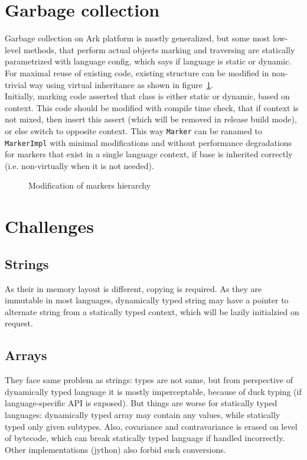 \documentclass[times, %
               specification,annotation, %
               titlepage-extra-ru,specification-extra-ru,annotation-extra-ru, %
               languages={russian,english} %
              ]{itmo-student-thesis}
\begin{document}
\section{Garbage collection}
Garbage collection on Ark platform is mostly generalized, but some most low-level methods, that perform actual objects marking and traversing are statically parametrized with language config, which says if language is static or dynamic. For maximal reuse of existing code, existing structure can be modified in non-trivial way using virtual inheritance as shown in figure~\ref{fig:gc-markers}.\\
Initially, marking code asserted that class is either static or dynamic, based on context. This code should be modified with compile time check, that if context is not mixed, then insert this assert (which will be removed in release build mode), or else switch to opposite context. This way \texttt{Marker} can be ranamed to \texttt{MarkerImpl} with minimal modifications and without performance degradations for markers that exist in a single language context, if base is inherited correctly (i.e. non-virtually when it is not needed).\\
\begin{figure}[H]
\caption{Modification of markers hierarchy}\label{fig:gc-markers}
\centering
\end{figure}

\section{Challenges}
\subsection{Strings}
As their in memory layout is different, copying is required. As they are immutable in most languages, dynamically typed string may have a pointer to alternate string from a statically typed context, which will be lazily initialzied on request.
\subsection{Arrays}
They face same problem as strings: types are not same, but from perspective of dynamically typed language it is mostly imperceptable, because of duck typing (if language-specific API is exposed). But things are worse for statically typed languages: dynamically typed array may contain any values, while statically typed only given subtypes. Also, covariance and contravariance is erased on level of bytecode, which can break statically typed language if handled incorrectly. Other implementations (jython) also forbid such conversions.
\end{document}
